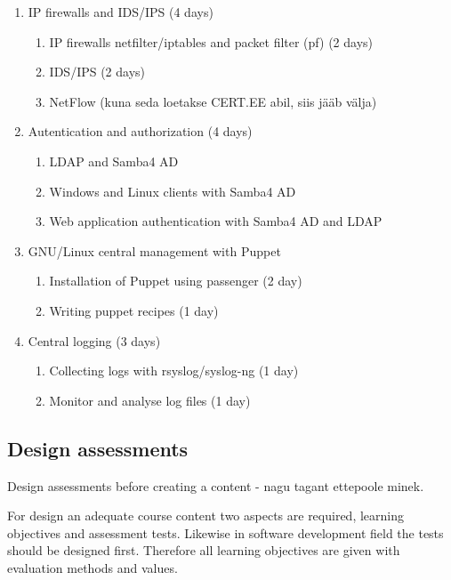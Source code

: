 \begin{enumerate}[label=Hands-on block \arabic*.,leftmargin=*]
    \item IP firewalls and IDS/IPS (4 days)
        \begin{enumerate}[label=LAB \arabic*.,leftmargin=*]
  		\item IP firewalls netfilter/iptables and packet filter (pf) (2 days)
	  	\item IDS/IPS (2 days)
  		\item NetFlow (kuna seda loetakse CERT.EE abil, siis jääb välja)
		\end{enumerate}
    \item Autentication and authorization (4 days)
        \begin{enumerate}[label=LAB \arabic*.,leftmargin=*]
  		\item LDAP and Samba4 AD
	  	\item Windows and Linux clients with Samba4 AD 
  		\item Web application authentication with Samba4 AD and LDAP
    		\end{enumerate}
    \item GNU/Linux central management with Puppet
        \begin{enumerate}[label=LAB \arabic*.,leftmargin=*]
	  		\item Installation of Puppet using passenger (2 day)
		  	\item Writing puppet recipes (1 day)
    		\end{enumerate}
    	\item Central logging (3 days)
    	    \begin{enumerate}[label=LAB \arabic*.,leftmargin=*]
	  		\item Collecting logs with rsyslog/syslog-ng (1 day)
		  	\item Monitor and analyse log files (1 day)
    		\end{enumerate}
\end{enumerate}



\subsection{Design assessments}



Design assessments before creating a content - nagu tagant ettepoole minek.

For design an adequate course content two aspects are required, learning objectives and assessment tests. Likewise in software development field the tests should be designed first. Therefore all learning objectives are given with evaluation methods and values.  


